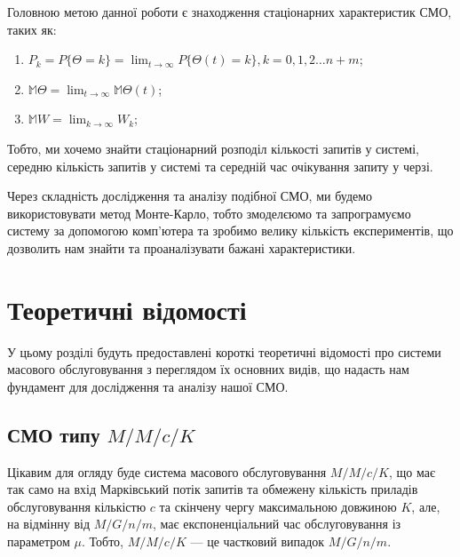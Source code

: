 \documentclass[14pt]{extarticle}
\begin{document}
Головною метою данної роботи є знаходження стаціонарних характеристик СМО, таких
як:

\begin{enumerate}
  \item \(P_{k} = P\{\Theta = k\} = \lim_{t \to \infty}P\{\Theta(t) = k\}, k = 0,1,2 \ldots n+m\);
  \item \(\mathbb{M} \Theta = \lim_{t \to \infty} \mathbb{M} \Theta(t)\);
  \item \(\mathbb{M} W = \lim_{k \to \infty} W_k \);
\end{enumerate}

Тобто, ми хочемо знайти стаціонарний розподіл кількості запитів у системі, середню
кількість запитів у системі та середній час очікування запиту у черзі.

Через складність дослідження та аналізу подібної СМО, ми будемо використовувати
метод Монте-Карло, тобто змоделєюмо та запрограмуємо систему за допомогою
комп'ютера та зробимо велику кількість експериментів, що дозволить нам знайти та
проаналізувати бажані характеристики.

\newpage

\section{Теоретичні відомості}

У цьому розділі будуть предоставлені короткі теоретичні відомості про системи
масового обслуговування з переглядом їх основних видів, що надасть нам
фундамент для дослідження та аналізу нашої СМО.

\subsection{СМО типу \(M/M/c/K\)}\label{sec:mmck}

Цікавим для огляду буде система масового обслуговування \(M/M/c/K\), що має так
само на вхід Марківський потік запитів та обмежену кількість приладів
обслуговування кількістю \(c\) та скінчену чергу максимальною довжиною \(K\),
але, на відмінну від \(M/G/n/m\), має експоненціальний час обслуговування із
параметром \(\mu\). Тобто, \(M/M/c/K\) --- це частковий випадок \(M/G/n/m\).
\end{document}
